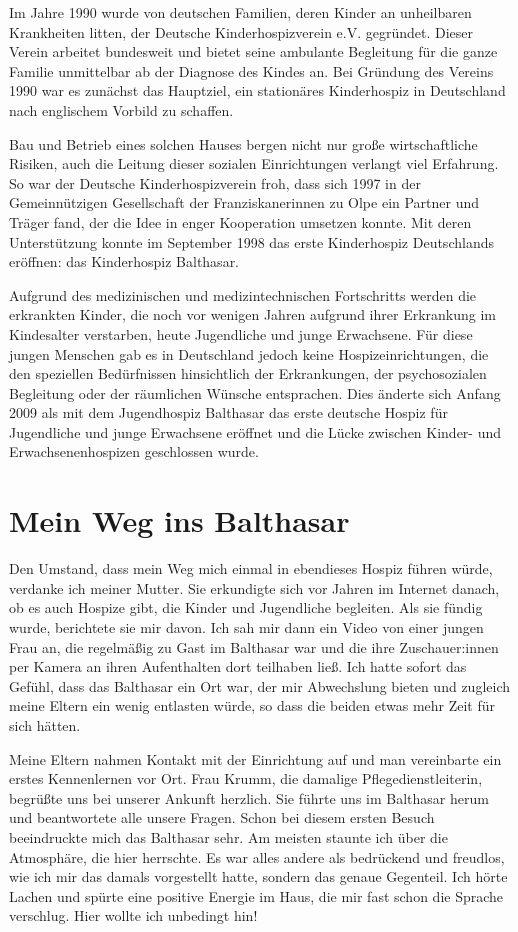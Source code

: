 \documentclass[fontsize=14pt,a4paper,headinclude,DIV=calc,automark]{scrbook}
\begin{document}
Im Jahre 1990 wurde von deutschen Familien, deren Kinder an unheilbaren Krankheiten litten, der Deutsche Kinderhospizverein e.V. gegründet. Dieser Verein arbeitet bundesweit und bietet seine ambulante Begleitung für die ganze Familie unmittelbar ab der Diagnose des Kindes an. Bei Gründung des Vereins 1990 war es zunächst das Hauptziel, ein stationäres Kinderhospiz in Deutschland nach englischem Vorbild zu schaffen.

Bau und Betrieb eines solchen Hauses bergen nicht nur große wirtschaftliche Risiken, auch die Leitung dieser sozialen Einrichtungen verlangt viel Erfahrung. So war der Deutsche Kinderhospizverein froh, dass sich 1997 in der Gemeinnützigen Gesellschaft der Franziskanerinnen zu Olpe ein Partner und Träger fand, der die Idee in enger Kooperation umsetzen konnte. Mit deren Unterstützung konnte im September 1998 das erste Kinderhospiz Deutschlands eröffnen: das Kinderhospiz Balthasar.

Aufgrund des medizinischen und medizintechnischen Fortschritts werden die erkrankten Kinder, die noch vor wenigen Jahren aufgrund ihrer Erkrankung im Kindesalter verstarben, heute Jugendliche und junge Erwachsene. Für diese jungen Menschen gab es in Deutschland jedoch keine Hospizeinrichtungen, die den speziellen Bedürfnissen hinsichtlich der Erkrankungen, der psychosozialen Begleitung oder der räumlichen Wünsche entsprachen. Dies änderte sich Anfang 2009 als mit dem Jugendhospiz Balthasar das erste deutsche Hospiz für Jugendliche und junge Erwachsene eröffnet und die Lücke zwischen Kinder- und Erwachsenenhospizen geschlossen wurde.

\section{Mein Weg ins Balthasar}

Den Umstand, dass mein Weg mich einmal in ebendieses Hospiz führen würde, verdanke ich meiner Mutter. Sie erkundigte sich vor Jahren im Internet danach, ob es auch Hospize gibt, die Kinder und Jugendliche begleiten. Als sie fündig wurde, berichtete sie mir davon. Ich sah mir dann ein Video von einer jungen Frau an, die regelmäßig zu Gast im Balthasar war und die ihre Zuschauer:innen per Kamera an ihren Aufenthalten dort teilhaben ließ. Ich hatte sofort das Gefühl, dass das Balthasar ein Ort war, der mir Abwechslung bieten und zugleich meine Eltern ein wenig entlasten würde, so dass die beiden etwas mehr Zeit für sich hätten.

Meine Eltern nahmen Kontakt mit der Einrichtung auf und man vereinbarte ein erstes Kennenlernen vor Ort. Frau Krumm, die damalige Pflegedienstleiterin, begrüßte uns bei unserer Ankunft herzlich. Sie führte uns im Balthasar herum und beantwortete alle unsere Fragen. Schon bei diesem ersten Besuch beeindruckte mich das Balthasar sehr. Am meisten staunte ich über die Atmosphäre, die hier herrschte. Es war alles andere als bedrückend und freudlos, wie ich mir das damals vorgestellt hatte, sondern das genaue Gegenteil. Ich hörte Lachen und spürte eine positive Energie im Haus, die mir fast schon die Sprache verschlug. Hier wollte ich unbedingt hin!
\end{document}
